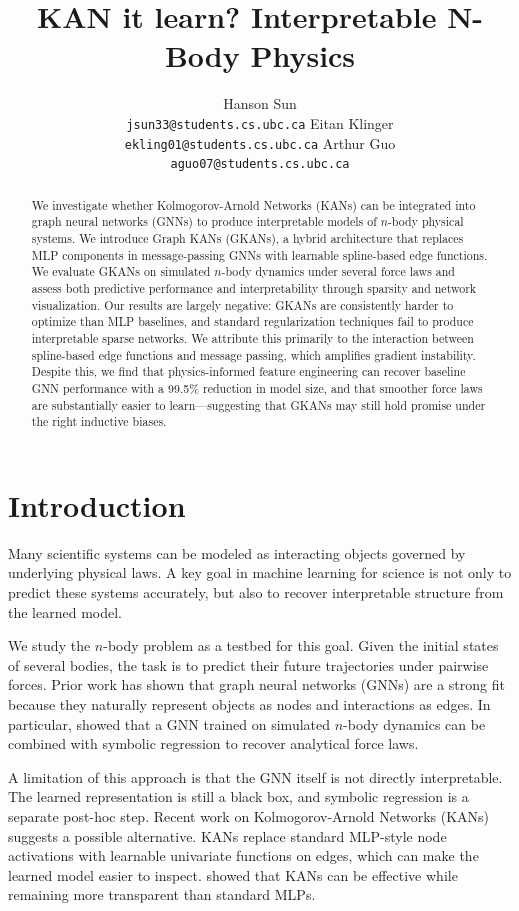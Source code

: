 \documentclass{article}
\title{KAN it learn? Interpretable N-Body Physics}
\author{%
  Hanson Sun\\
  \texttt{jsun33@students.cs.ubc.ca}
  \And
  Eitan Klinger\\
  \texttt{ekling01@students.cs.ubc.ca}
  \And
  Arthur Guo\\
  \texttt{aguo07@students.cs.ubc.ca}
}
\begin{document}
\maketitle


\begin{abstract}
    We investigate whether Kolmogorov-Arnold Networks (KANs) can be integrated into graph neural networks (GNNs) to produce interpretable models of $n$-body physical systems. We introduce Graph KANs (GKANs), a hybrid architecture that replaces MLP components in message-passing GNNs with learnable spline-based edge functions. We evaluate GKANs on simulated $n$-body dynamics under several force laws and assess both predictive performance and interpretability through sparsity and network visualization. Our results are largely negative: GKANs are consistently harder to optimize than MLP baselines, and standard regularization techniques fail to produce interpretable sparse networks. We attribute this primarily to the interaction between spline-based edge functions and message passing, which amplifies gradient instability. Despite this, we find that physics-informed feature engineering can recover baseline GNN performance with a 99.5\% reduction in model size, and that smoother force laws are substantially easier to learn---suggesting that GKANs may still hold promise under the right inductive biases.
\end{abstract}

\section{Introduction}

Many scientific systems can be modeled as interacting objects governed by underlying physical laws. A key goal in machine learning for science is not only to predict these systems accurately, but also to recover interpretable structure from the learned model.

We study the $n$-body problem as a testbed for this goal. Given the initial states of several bodies, the task is to predict their future trajectories under pairwise forces. Prior work has shown that graph neural networks (GNNs) are a strong fit because they naturally represent objects as nodes and interactions as edges. In particular, \cite{cranmer2020discoveringsymbolicmodelsdeep} showed that a GNN trained on simulated $n$-body dynamics can be combined with symbolic regression to recover analytical force laws.

A limitation of this approach is that the GNN itself is not directly interpretable. The learned representation is still a black box, and symbolic regression is a separate post-hoc step. Recent work on Kolmogorov-Arnold Networks (KANs) suggests a possible alternative. KANs replace standard MLP-style node activations with learnable univariate functions on edges, which can make the learned model easier to inspect. \cite{liu2024kankolmogorovarnoldnetworks} showed that KANs can be effective while remaining more transparent than standard MLPs.
\end{document}
